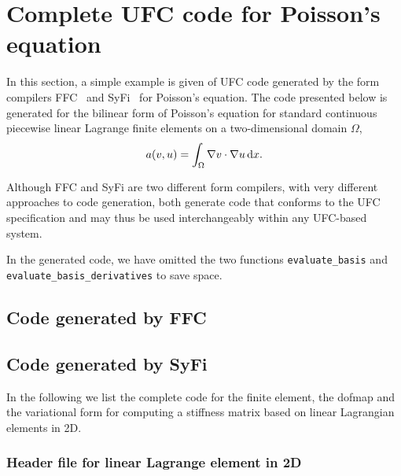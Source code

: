 \chapter{Complete UFC code for Poisson's equation}

In this section, a simple example is given of UFC code generated by
the form compilers
FFC~\cite{www:ffc,logg:article:07,logg:article:09,logg:article:10,logg:article:11}
and SyFi~\cite{www:syfi} for Poisson's equation. The code presented
below is generated for the bilinear form of Poisson's equation for
standard continuous piecewise linear Lagrange finite elements on a
two-dimensional domain $\Omega$,
\begin{equation}
  a(v, u) = \int_{\Omega} \nabla v \cdot \nabla u \, \mathrm{d}x.
\end{equation}

Although FFC and SyFi are two different form compilers, with very
different approaches to code generation, both generate code that
conforms to the UFC specification and may thus be used interchangeably
within any UFC-based system.

In the generated code, we have omitted the two functions
\texttt{evaluate\_basis} and
\texttt{evaluate\_basis\_derivatives}\footnotemark{} to save space.


\section{Code generated by FFC}

\scriptsize
{}
\normalsize

\section{Code generated by SyFi}

In the following we list the complete code for the finite element, 
the dofmap and the variational form for computing a stiffness matrix
based on linear Lagrangian elements in 2D. 

\subsection{Header file for linear Lagrange element in 2D}

